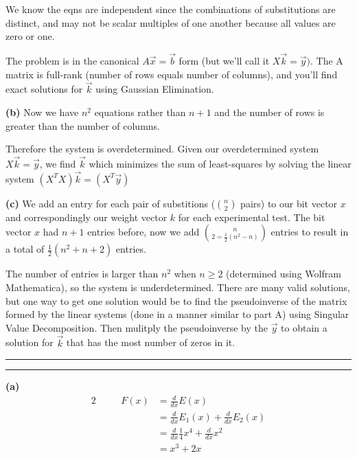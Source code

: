 \documentclass[11pt,letterpaper]{article}
\newcommand{\question}[1] {\vspace{.25in} \hrule\vspace{0.5em}
\noindent{\bf #1} \vspace{0.5em}
\hrule \vspace{.10in}}
\renewcommand{\part}[1] {\vspace{.10in} {\bf (#1)}}
\begin{document}
We know the eqns are independent since the combinations of substitutions are distinct, and may not be scalar multiples of one another because all values are zero or one.

The problem is in the canonical $A\vec{x} = \vec{b}$ form (but we'll call it  $X \vec{k} = \vec{y})$.
The A matrix is full-rank (number of rows equals number of columns), and you'll find exact solutions for $\vec{k}$ using Gaussian Elimination.

\part{b}
Now we have $n^2$ equations rather than $n+1$ and the number of rows is greater than the number of columns.

Therefore the system is overdetermined.
Given our overdetermined system $X \vec{k} = \vec{y}$, we find $\vec{k}$ which minimizes the sum of least-squares by solving the linear system $(X^T X)\vec{k} = (X^T \vec{y})$

\part{c}
We add an entry for each pair of substitions ($n \choose 2$ pairs) to our bit vector $x$ and correspondingly our weight vector $k$ for each experimental test.
The bit vector $x$ had $n+1$ entries before, now we add $n \choose 2 = \frac{1}{2}(n^2 - n)$ entries to result in a total of $\frac{1}{2}(n^2+n+2)$ entries.

The number of entries is larger than $n^2$ when $n \geq 2$ (determined using Wolfram Mathematica), so the system is underdetermined.
There are many valid solutions, but one way to get one solution would be to find the pseudoinverse of the matrix formed by the linear systems (done in a manner similar to part A) using Singular Value Decomposition.
Then mulitply the pseudoinverse by the $\vec{y}$ to obtain a solution for $\vec{k}$ that has the most number of zeros in it.

\question{2}
\part{a}
\begin{alignat*}{2}
  &\quad & F(x) &= \frac{d}{dx} E(x)\\ 
  &&&= \frac{d}{dx} E_1(x) + \frac{d}{dx} E_2(x) \\  
  &&&= \frac{d}{dx} \frac{1}{4} x^{4} + \frac{d}{dx} x^2 \\  
  &&&= x^{3} + 2x
\end{alignat*}
\end{document}

